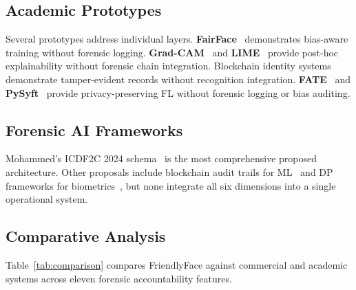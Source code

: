 \documentclass[conference]{IEEEtran}
\begin{document}
\subsection{Academic Prototypes}

Several prototypes address individual layers. \textbf{FairFace}~\cite{karkkainen2021fairface} demonstrates bias-aware training without forensic logging. \textbf{Grad-CAM}~\cite{selvaraju2017gradcam} and \textbf{LIME}~\cite{ribeiro2016lime} provide post-hoc explainability without forensic chain integration. Blockchain identity systems~\cite{muhle2018ssi} demonstrate tamper-evident records without recognition integration. \textbf{FATE}~\cite{liu2021fate} and \textbf{PySyft}~\cite{ryffel2018pysyft} provide privacy-preserving FL without forensic logging or bias auditing.

\subsection{Forensic AI Frameworks}

Mohammed's ICDF2C 2024 schema~\cite{mohammed2024forensic} is the most comprehensive proposed architecture. Other proposals include blockchain audit trails for ML~\cite{sarpatwar2020auditable} and DP frameworks for biometrics~\cite{feddp2024}, but none integrate all six dimensions into a single operational system.

\subsection{Comparative Analysis}

Table~\ref{tab:comparison} compares FriendlyFace against commercial and academic systems across eleven forensic accountability features.
\end{document}
